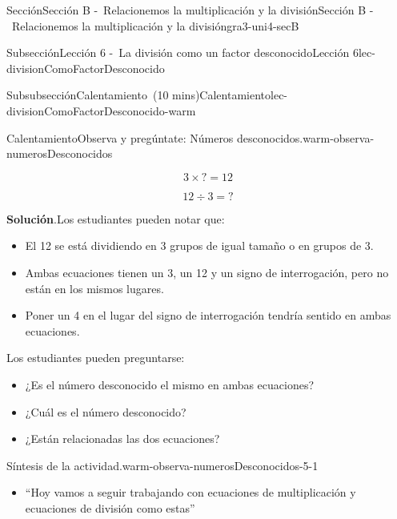 \documentclass[oneside,10pt,]{article}
\newcommand{\blocktitlefont}{\relax}
\begin{document}
\begin{sectionptx}{Sección}{Sección B -~Relacionemos la multiplicación y la división}{}{Sección B -~Relacionemos la multiplicación y la división}{}{}{gra3-uni4-secB}
\begin{subsectionptx}{Subsección}{Lección 6 -~La división como un factor desconocido}{}{Lección 6}{}{}{lec-divisionComoFactorDesconocido}
\begin{subsubsectionptx}{Subsubsección}{Calentamiento~(10 mins)}{}{Calentamiento}{}{}{lec-divisionComoFactorDesconocido-warm}
\begin{exploration}{Calentamiento}{Observa y pregúntate: Números desconocidos.}{warm-observa-numerosDesconocidos}
\begin{sidebyside}{2}{0}{0}{0}%
\begin{sbspanel}{0.5}%
%
\begin{equation*}
3\times {?} =12
\end{equation*}
%
\end{sbspanel}%
\begin{sbspanel}{0.5}%
\par
%
\begin{equation*}
12\div 3 ={?}
\end{equation*}
%
\end{sbspanel}%
\end{sidebyside}%
\par\smallskip%
\noindent\textbf{\blocktitlefont Solución}.\hypertarget{warm-observa-numerosDesconocidos-3}{}\quad{}Los estudiantes pueden notar que:%
%
\begin{itemize}[label=\textbullet]
\item{}El 12 se está dividiendo en 3 grupos de igual tamaño o en grupos de 3.%
\item{}Ambas ecuaciones tienen un 3, un 12 y un signo de interrogación, pero no están en los mismos lugares.%
\item{}Poner un 4 en el lugar del signo de interrogación tendría sentido en ambas ecuaciones.%
\end{itemize}
Los estudiantes pueden preguntarse:%
%
\begin{itemize}[label=\textbullet]
\item{}¿Es el número desconocido el mismo en ambas ecuaciones?%
\item{}¿Cuál es el número desconocido?%
\item{}¿Están relacionadas las dos ecuaciones?%
\end{itemize}
\end{exploration}%
\par
\begin{paragraphs}{Síntesis de la actividad.}{warm-observa-numerosDesconocidos-5-1}%
%
\begin{itemize}[label=\textbullet]
\item{}``Hoy vamos a seguir trabajando con ecuaciones de multiplicación y ecuaciones de división como estas''%
\end{itemize}
\end{paragraphs}%
\end{subsubsectionptx}
%
%
\typeout{************************************************}
\typeout{************************************************}

\end{subsectionptx}
\end{sectionptx}
\end{document}
